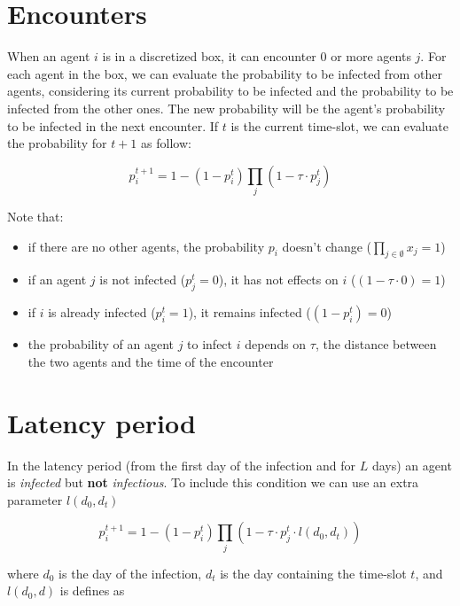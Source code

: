 \documentclass[12pt, a4paper]{article}
\newcommand{\expr}[1]{\left(#1\right)}
\begin{document}
\section{Encounters}

When an agent $i$ is in a discretized box, it can encounter $0$ or more agents $j$. For each agent in the box, we can evaluate the probability to be infected from other agents, considering its current probability to be infected and the probability to be infected from the other ones. The new probability will be the agent's probability to be infected in the next encounter. If $t$ is the current time-slot, we can evaluate the probability for $t+1$ as follow:

\begin{equation}\label{eq:nextprob}
     p_{i}^{t+1} = 1 - \expr{1 - p_i^t} \prod_{j}\expr{1 - \tau{}\cdot{p_j^t}}
\end{equation}


Note that:
\begin{itemize}
    \item if there are no other agents, the probability $p_i$ doesn't change ($\prod_{j \in \emptyset{}}x_j = 1$)
    \item if an agent $j$ is not infected ($p_j^t=0$), it has not effects on $i$ ($(1 - \tau{}\cdot{0}) = 1$)
    \item if $i$ is already infected ($p_i^t=1$), it remains infected ($(1 - p_i^t)=0$)
    \item the probability of an agent $j$ to infect $i$ depends on $\tau$, the distance between the two agents and the time of the encounter
\end{itemize}

\section{Latency period}

In the latency period (from the first day of the infection and for $L$ days) an agent is \textit{infected} but \textbf{not} \textit{infectious}. To include this condition we can use an extra parameter $l(d_0, d_t)$

\begin{equation}
     p_{i}^{t+1} = 1 - \expr{1 - p_i^t} \prod_{j}\expr{1 - \tau{}\cdot{p_j^t}\cdot{l(d_0, d_t)}}
\end{equation}

where $d_0$ is the day of the infection, $d_t$ is the day containing the time-slot $t$, and $l(d_0, d)$ is defines as
\end{document}

